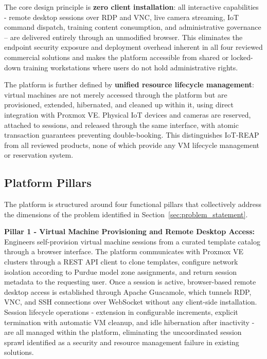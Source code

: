 The core design principle is \textbf{zero client installation}: all interactive
capabilities - remote desktop sessions over RDP and VNC, live camera streaming,
IoT command dispatch, training content consumption, and administrative governance --
are delivered entirely through an unmodified browser. This eliminates the endpoint
security exposure and deployment overhead inherent in all four reviewed commercial
solutions and makes the platform accessible from shared or locked-down training
workstations where users do not hold administrative rights.

The platform is further defined by \textbf{unified resource lifecycle management}:
virtual machines are not merely accessed through the platform but are provisioned,
extended, hibernated, and cleaned up within it, using direct integration with
Proxmox VE. Physical IoT devices and cameras are reserved, attached to sessions,
and released through the same interface, with atomic transaction guarantees preventing
double-booking. This distinguishes IoT-REAP from all reviewed products, none of which
provide any VM lifecycle management or reservation system.

\subsection{Platform Pillars}

The platform is structured around four functional pillars that collectively address
the dimensions of the problem identified in Section~\ref{sec:problem_statement}.

\textbf{Pillar 1 - Virtual Machine Provisioning and Remote Desktop Access:}
Engineers self-provision virtual machine sessions from a curated template catalog
through a browser interface. The platform communicates with Proxmox VE clusters
through a REST API client to clone templates, configure network isolation according
to Purdue model zone assignments, and return session metadata to the requesting
user. Once a session is active, browser-based remote desktop access is established
through Apache Guacamole, which tunnels RDP, VNC, and SSH connections over WebSocket
without any client-side installation. Session lifecycle operations - extension in
configurable increments, explicit termination with automatic VM cleanup, and idle
hibernation after inactivity - are all managed within the platform, eliminating
the uncoordinated session sprawl identified as a security and resource management
failure in existing solutions.

